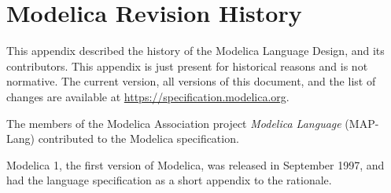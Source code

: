 \chapter{Modelica Revision History}\label{modelica-revision-history}

This appendix described the history of the Modelica Language Design, and its contributors.
This appendix is just present for historical reasons and is not normative.
The current version, all versions of this document, and the list of changes are available at \url{https://specification.modelica.org}.

The members of the Modelica Association project \emph{Modelica Language} (MAP-Lang) contributed to the Modelica specification.

Modelica 1, the first version of Modelica, was released in September 1997, and had the language specification as a short appendix to the rationale.
